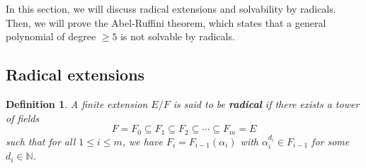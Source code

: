 \documentclass[10pt]{article}
\newcommand{\N}{\mathbb{N}}
\theoremstyle{newstyle}
\newtheorem{defn}[thm]{Definition}
\begin{document}
In this section, we will discuss radical extensions and solvability by radicals. Then, we will 
prove the Abel-Ruffini theorem, which states that a general polynomial of degree $\geq 5$ is 
not solvable by radicals. 

\subsection{Radical extensions}

\begin{defn}
A finite extension $E/F$ is said to be {\bf radical} if there exists a tower of fields 
\[ F = F_0 \subseteq F_1 \subseteq F_2 \subseteq \cdots \subseteq F_m = E \]
such that for all $1 \leq i \leq m$, we have $F_i = F_{i-1}(\alpha_i)$ 
with $\alpha_i^{d_i} \in F_{i-1}$ for some $d_i \in \N$. 
\end{defn}
\end{document}
